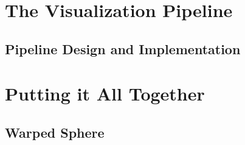\section{The Visualization Pipeline}
\label{sec:visualization_pipeline}

\subsection{Pipeline Design and Implementation}
\label{subsec:pipeline_design_implemnentaion}

\section{Putting it All Together}

\subsection{Warped Sphere}

